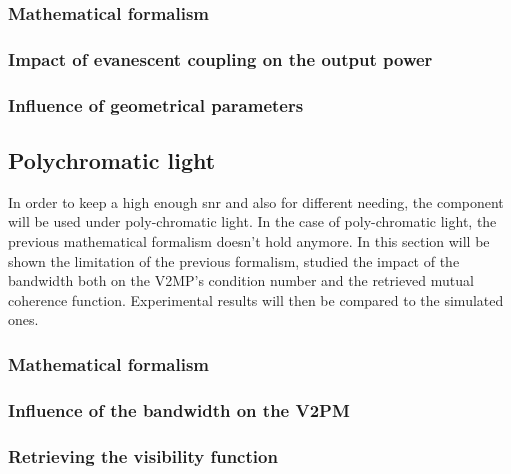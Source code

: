 \documentclass[a4paper,twoside,11pt]{article}
\begin{document}
        \subsubsection{Mathematical formalism}\label{sec:mathmono}
        
        
        \subsubsection{Impact of evanescent coupling on the output power}
        
        
        \subsubsection{Influence of geometrical parameters}
        
        
\newpage 
    \subsection{Polychromatic light}
    In order to keep a high enough \gls{snr} and also for different needing, the component will be used under poly-chromatic light. In the case of poly-chromatic light, the previous mathematical formalism doesn't hold anymore. In this section will be shown the limitation of the previous formalism, studied the impact of the bandwidth both on the V2MP's condition number and the retrieved mutual coherence function. Experimental results will then be compared to the simulated ones. 
    
        \subsubsection{Mathematical formalism}\label{sec:mathpoly}
        
        
        \subsubsection{Influence of the bandwidth on the V2PM}
        
        
        \subsubsection{Retrieving the visibility function}
        
\newpage
\end{document}
